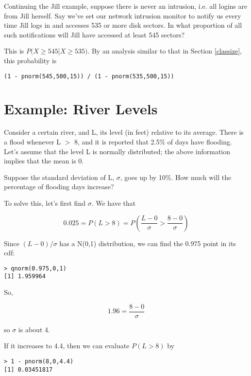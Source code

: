 Continuing the Jill example, suppose there is never an intrusion, i.e.
all logins are from Jill herself.  Say we've set our network intrusion
monitor to notify us every time Jill logs in and accesses 535 or more
disk sectors.  In what proportion of all such notifications will Jill
have accessed at least 545 sectors?  

This is $P(X \geq 545 $|$ X \geq 535)$.  By an analysis similar
to that in Section \ref{classize}, this probability is

\begin{lstlisting}
(1 - pnorm(545,500,15)) / (1 - pnorm(535,500,15))
\end{lstlisting}

\section{Example:  River Levels}

Consider a certain river, and L, its level (in feet) relative to its
average. There is a flood whenever L $>$ 8, and it is reported that 
2.5\% of days have flooding.  Let's assume that the level 
L is normally distributed; the above information implies that the mean
is 0. 

Suppose the standard deviation of L, $\sigma$, goes up by 10\%. How much
will the percentage of flooding days increase?

To solve this, let's first find $\sigma$.  We have that

\begin{equation}
0.025 = P(L > 8) = P \left ( \frac{L-0}{\sigma} > \frac{8-0}{\sigma}
\right )
\end{equation}

Since $(L-0)/\sigma$ has a N(0,1) distribution, we can find the 0.975
point in its cdf:

\begin{lstlisting}
> qnorm(0.975,0,1)
[1] 1.959964
\end{lstlisting}

So,

\begin{equation}
1.96 =  \frac{8-0}{\sigma}
\end{equation}

so $\sigma$ is about 4.

If it increases to 4.4, then we can evaluate $P(L > 8)$ by

\begin{lstlisting}
> 1 - pnorm(8,0,4.4)
[1] 0.03451817
\end{lstlisting}

